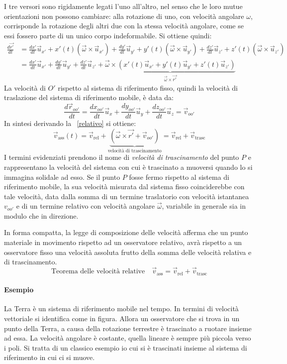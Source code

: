 \documentclass[10pt,a4paper]{book}
\begin{document}
I tre versori sono rigidamente legati l'uno all'altro, nel senso che le loro mutue orientazioni non possono cambiare: alla rotazione di uno, con velocità angolare $\omega$, corrisponde la rotazione degli altri due con la stessa velocità angolare, come se essi fossero parte di un unico corpo indeformabile. Si ottiene quindi:
\begin{equation*}
	\begin{aligned}
		\frac{d\vec{r'}}{dt} &= \frac{dx'}{dt} \vec{u}_{x'}+x'(t)(\vec{\omega} \times \vec{u}_{x'})+\frac{dy'}{dt} \vec{u}_{y'} +y'(t)(\vec{\omega} \times \vec{u}_{y'})+\frac{dz'}{dt} \vec{u}_{z'} +z'(t)(\vec{\omega} \times \vec{u}_{z'} ) \\
		&= \frac{dx'}{dt}\vec{u}_{x'}+ \frac{dy'}{dt}\vec{u}_{y'}+ \frac{dz'}{dt}\vec{u}_{z'} + \underbrace{\vec{\omega} \times (x'(t)\vec{u}_{x'}+y'(t)\vec{u}_{y'}+z'(t)\vec{u}_{z'})}_{\vec{\omega} \times \vec{r'}}
	\end{aligned}
\end{equation*}
La velocità di $O'$ rispetto al sistema di riferimento fisso, quindi la velocità di traslazione del sistema di riferimento mobile, è data da:
\[
	\frac{d\vec{r}_{oo'}}{dt}=\frac{dx_{oo'}}{dt}\vec{u}_x+\frac{dy_{oo'}}{dt}\vec{u}_y+\frac{dz_{oo'}}{dt}\vec{u}_z=\vec{v}_{oo'}
\]
In sintesi derivando la ~\eqref{relativo} si ottiene:
\[
	\vec{v}_{\text{ass}}(t)=\vec{v}_{\text{rel}}+\underbrace{(\vec{\omega} \times \vec{r'}+\vec{v}_{oo'})}_{\text{velocità di trascinamento}}=\vec{v}_{\text{rel}}+ \vec{v}_{ \text{trasc} }
\]
I termini evidenziati prendono il nome di \emph{velocità di trascinamento} del punto $P$ e rappresentano la velocità del sistema con cui è trascinato a muoversi quando lo si immagina solidale ad esso. Se il punto $P$ fosse fermo rispetto al sistema di riferimento mobile, la sua velocità misurata dal sistema fisso coinciderebbe con tale velocità, data dalla somma di un termine traslatorio con velocità istantanea $v_{oo'}$ e di un termine relativo con velocità angolare $\vec{\omega}$, variabile in generale sia in modulo che in direzione.

In forma compatta, la legge di composizione delle velocità afferma che un punto materiale in movimento rispetto ad un osservatore relativo, avrà rispetto a un osservatore fisso una velocità assoluta frutto della somma delle velocità relativa e di trascinamento.
\[
	\text{Teorema delle velocità relative} \quad \boxed{\vec{v}_{\text{ass}}=\vec{v}_{\text{rel}}+\vec{v}_{\text{trasc}}}
\]

\paragraph{Esempio} La Terra è un sistema di riferimento mobile nel tempo. In termini di velocità vettoriale si identifica come in figura. Allora un osservatore che si trova in un punto della Terra, a causa della rotazione terrestre è trascinato a ruotare insieme ad essa. La velocità angolare è costante, quella lineare è sempre più piccola verso i poli. Si tratta di un classico esempio io cui si è trascinati insieme al sistema di riferimento in cui ci si muove.
\end{document}
